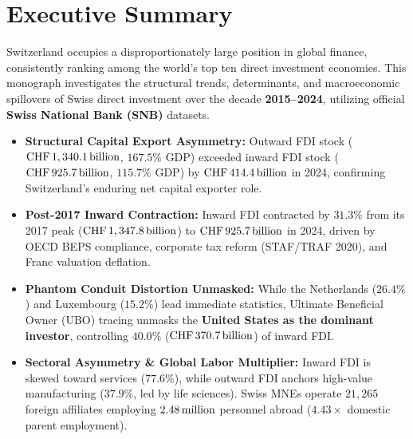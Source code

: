 
\section*{Executive Summary}

Switzerland occupies a disproportionately large position in global finance, consistently ranking among the world's top ten direct investment economies. This monograph investigates the structural trends, determinants, and macroeconomic spillovers of Swiss direct investment over the decade \textbf{2015--2024}, utilizing official \textbf{Swiss National Bank (SNB)} datasets.

\begin{findingbox}
\begin{itemize}[leftmargin=1.2em, itemsep=1.5pt]
    \item \textbf{Structural Capital Export Asymmetry:} Outward FDI stock ($\text{CHF}\,1,340.1\,\text{billion}$, $167.5\%$ GDP) exceeded inward FDI stock ($\text{CHF}\,925.7\,\text{billion}$, $115.7\%$ GDP) by $\text{CHF}\,414.4\,\text{billion}$ in 2024, confirming Switzerland's enduring net capital exporter role.
    \item \textbf{Post-2017 Inward Contraction:} Inward FDI contracted by $31.3\%$ from its 2017 peak ($\text{CHF}\,1,347.8\,\text{billion}$) to $\text{CHF}\,925.7\,\text{billion}$ in 2024, driven by OECD BEPS compliance, corporate tax reform (STAF/TRAF 2020), and Franc valuation deflation.
    \item \textbf{Phantom Conduit Distortion Unmasked:} While the Netherlands ($26.4\%$) and Luxembourg ($15.2\%$) lead immediate statistics, Ultimate Beneficial Owner (UBO) tracing unmasks the \textbf{United States as the dominant investor}, controlling $40.0\%$ ($\text{CHF}\,370.7\,\text{billion}$) of inward FDI.
    \item \textbf{Sectoral Asymmetry \& Global Labor Multiplier:} Inward FDI is skewed toward services ($77.6\%$), while outward FDI anchors high-value manufacturing ($37.9\%$, led by life sciences). Swiss MNEs operate $21,265$ foreign affiliates employing $2.48\,\text{million}$ personnel abroad ($4.43\times$ domestic parent employment).
\end{itemize}
\end{findingbox}
